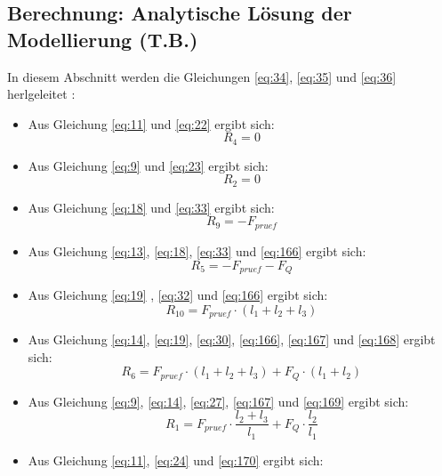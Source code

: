 \subsection{Berechnung: Analytische Lösung der Modellierung (T.B.)}\label{Lösung}
In diesem Abschnitt werden die Gleichungen \ref{eq:34}, \ref{eq:35} und \ref{eq:36} herlgeleitet \cite{item16}\cite{item9}:
\begin{itemize}
	\item Aus Gleichung \ref{eq:11} und \ref{eq:22} ergibt sich:
	\begin{equation}\label{eq:164}
		R_{4}=0
	\end{equation}
	\item Aus Gleichung \ref{eq:9} und \ref{eq:23} ergibt sich:
	\begin{equation}\label{eq:165}
		R_{2}=0
	\end{equation}
	\item Aus Gleichung \ref{eq:18} und \ref{eq:33} ergibt sich:
	\begin{equation}\label{eq:166}
		R_{9}=-F_{pruef}
	\end{equation}
	\item Aus Gleichung \ref{eq:13}, \ref{eq:18}, \ref{eq:33} und \ref{eq:166} ergibt sich:
	\begin{equation}\label{eq:167}
		R_{5}=-F_{pruef}-F_{Q}
	\end{equation}
	\item Aus Gleichung \ref{eq:19} , \ref{eq:32} und \ref{eq:166} ergibt sich:
	\begin{equation}\label{eq:168}
		R_{10}=F_{pruef}\cdot (l_{1}+l_{2}+l_{3})
	\end{equation}
	\item Aus Gleichung \ref{eq:14}, \ref{eq:19}, \ref{eq:30}, \ref{eq:166}, \ref{eq:167} und \ref{eq:168} ergibt sich:
	\begin{equation}\label{eq:169}
		R_{6}=F_{pruef}\cdot (l_{1}+l_{2}+l_{3}) + F_{Q}\cdot (l_{1}+l_{2})
	\end{equation}
	\item Aus Gleichung \ref{eq:9}, \ref{eq:14}, \ref{eq:27}, \ref{eq:167} und \ref{eq:169} ergibt sich:
	\begin{equation}\label{eq:170}
		R_{1}=F_{pruef}\cdot\frac{l_{2}+l_{3}}{l_{1}} + F_{Q}\cdot\frac{l_{2}}{l_{1}}
	\end{equation}
	\item Aus Gleichung \ref{eq:11}, \ref{eq:24} und \ref{eq:170} ergibt sich:
	\begin{equation}\label{eq:171}

\end{equation}
\end{itemize}
